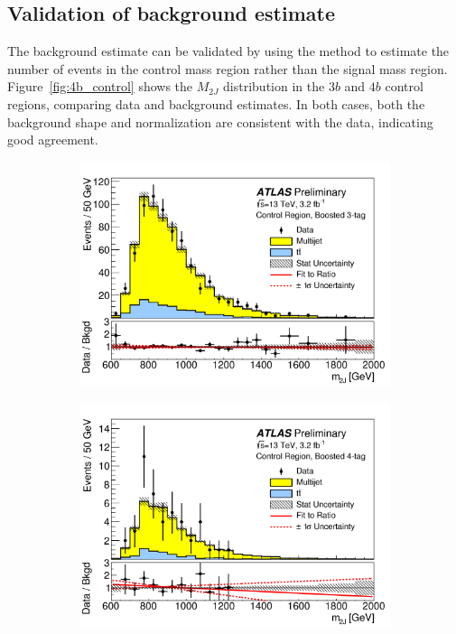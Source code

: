 \subsection{Validation of background estimate}

The background estimate can be validated by using the method to estimate the number of events in the control mass region rather than the signal mass region. Figure~\ref{fig:4b_control} shows the $M_{2J}$ distribution in the $3b$ and $4b$ control regions, comparing data and background estimates. In both cases, both the background shape and normalization are consistent with the data, indicating good agreement. 

\begin{figure}[h!]
  \centering
  \captionsetup{justification=centering}

   \begin{subfigure}[t]{0.5\textwidth}
        \centering
        \includegraphics[width=\textwidth]{figures/3b_control}
        \caption{}
    \end{subfigure}%
    \begin{subfigure}[t]{0.5\textwidth}
        \centering
        \includegraphics[width=\textwidth]{figures/4b_control}
        \caption{}
    \end{subfigure}


\end{figure}
